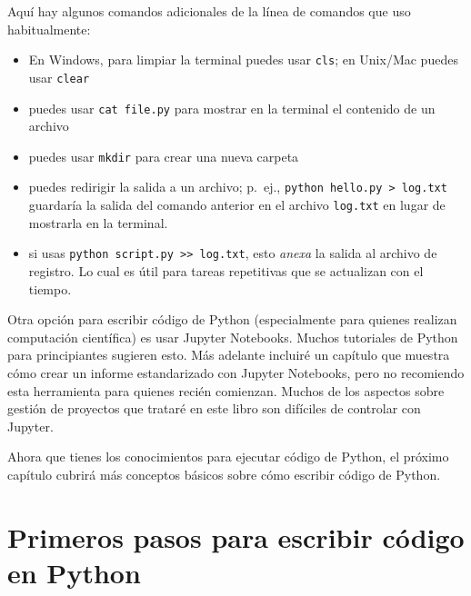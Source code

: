 \documentclass[
  letterpaper,
]{scrbook}
\providecommand{\tightlist}{%
  \setlength{\itemsep}{0pt}\setlength{\parskip}{0pt}}\usepackage{longtable,booktabs,array}
\begin{document}
\begin{tcolorbox}[enhanced jigsaw, colbacktitle=quarto-callout-note-color!10!white, arc=.35mm, opacityback=0, colframe=quarto-callout-note-color-frame, colback=white, left=2mm, leftrule=.75mm, title={Note}, bottomtitle=1mm, rightrule=.15mm, toptitle=1mm, coltitle=black, titlerule=0mm, toprule=.15mm, bottomrule=.15mm, opacitybacktitle=0.6, breakable]

Aquí hay algunos comandos adicionales de la línea de comandos que uso
habitualmente:

\begin{itemize}
\tightlist
\item
  En Windows, para limpiar la terminal puedes usar \texttt{cls}; en
  Unix/Mac puedes usar \texttt{clear}
\item
  puedes usar \texttt{cat\ file.py} para mostrar en la terminal el
  contenido de un archivo
\item
  puedes usar \texttt{mkdir} para crear una nueva carpeta
\item
  puedes redirigir la salida a un archivo; p.~ej.,
  \texttt{python\ hello.py\ \textgreater{}\ log.txt} guardaría la salida
  del comando anterior en el archivo \texttt{log.txt} en lugar de
  mostrarla en la terminal.
\item
  si usas
  \texttt{python\ script.py\ \textgreater{}\textgreater{}\ log.txt},
  esto \emph{anexa} la salida al archivo de registro. Lo cual es útil
  para tareas repetitivas que se actualizan con el tiempo.
\end{itemize}

\end{tcolorbox}

Otra opción para escribir código de Python (especialmente para quienes
realizan computación científica) es usar Jupyter Notebooks. Muchos
tutoriales de Python para principiantes sugieren esto. Más adelante
incluiré un capítulo que muestra cómo crear un informe estandarizado con
Jupyter Notebooks, pero no recomiendo esta herramienta para quienes
recién comienzan. Muchos de los aspectos sobre gestión de proyectos que
trataré en este libro son difíciles de controlar con Jupyter.

Ahora que tienes los conocimientos para ejecutar código de Python, el
próximo capítulo cubrirá más conceptos básicos sobre cómo escribir
código de Python.


\chapter{Primeros pasos para escribir código en
Python}\label{sec-started}
\end{document}
